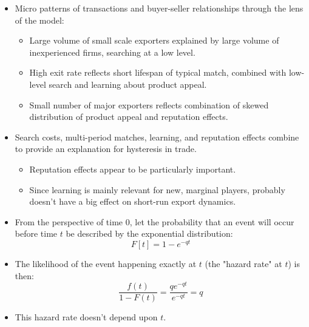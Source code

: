 \documentclass[notes=show]{beamer}
\begin{document}
\begin{frame}%


\begin{itemize}
\item Micro patterns of transactions and buyer-seller relationships through
the lens of the model:

\begin{itemize}
\item Large volume of small scale exporters explained by large volume of
inexperienced firms, searching at a low level.

\item High exit rate reflects short lifespan of typical match, combined with
low-level search and learning about product appeal.

\item Small number of major exporters reflects combination of skewed
distribution of product appeal and reputation effects.
\end{itemize}

\item Search costs, multi-period matches, learning, and reputation effects
combine to provide an explanation for hysteresis in trade.

\begin{itemize}
\item Reputation effects appear to be particularly important.

\item Since learning is mainly relevant for new, marginal players, probably
doesn't have a big effect on short-run export dynamics.
\end{itemize}
\end{itemize}

\end{frame}%
\begin{frame}%


\begin{itemize}
\item From the perspective of time 0, let the probability that an event will
occur before time $t$ be described by the exponential distribution:%
\[
F[t]=1-e^{-qt} 
\]

\item The likelihood of the event happening exactly at $t$ (the "hazard
rate" at $t$) is then: 
\[
\frac{f(t)}{1-F(t)}=\frac{qe^{-qt}}{e^{-qt}}=q 
\]

\item This hazard rate doesn't depend upon $t.$
\end{itemize}

\label{appendix}

\end{frame}%
\end{document}
